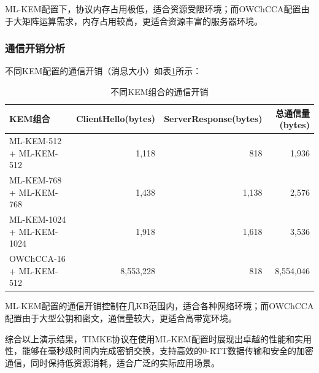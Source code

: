 ML-KEM配置下，协议内存占用极低，适合资源受限环境；而OWChCCA配置由于大矩阵运算需求，内存占用较高，更适合资源丰富的服务器环境。

\subsubsection{通信开销分析}

不同KEM配置的通信开销（消息大小）如表\ref{tab:comm-overhead}所示：

\begin{table}[ht]
\centering
\caption{不同KEM组合的通信开销}
\label{tab:comm-overhead}
\begin{tabular}{|l|r|r|r|}
\hline
\textbf{KEM组合} & \textbf{ClientHello(bytes)} & \textbf{ServerResponse(bytes)} & \textbf{总通信量(bytes)} \\
\hline
ML-KEM-512 + ML-KEM-512    & 1,118  & 818  & 1,936   \\
\hline
ML-KEM-768 + ML-KEM-768    & 1,438  & 1,138  & 2,576   \\
\hline
ML-KEM-1024 + ML-KEM-1024  & 1,918  & 1,618  & 3,536   \\
\hline
OWChCCA-16 + ML-KEM-512    & 8,553,228  & 818  & 8,554,046   \\
\hline
\end{tabular}
\end{table}

ML-KEM配置的通信开销控制在几KB范围内，适合各种网络环境；而OWChCCA配置由于大型公钥和密文，通信量较大，更适合高带宽环境。

综合以上演示结果，TIMKE协议在使用ML-KEM配置时展现出卓越的性能和实用性，能够在毫秒级时间内完成密钥交换，支持高效的0-RTT数据传输和安全的加密通信，同时保持低资源消耗，适合广泛的实际应用场景。
